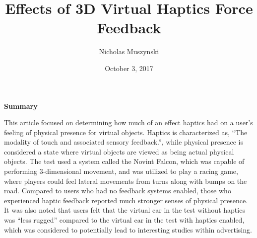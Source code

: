 \documentclass{article}
\begin{document}
\title{Effects of 3D Virtual Haptics Force Feedback}
\author{Nicholas Muszynski}
\date{October 3, 2017}

\maketitle

\textbf{Summary}
\newline

This article focused on determining how much of an effect haptics had on a user's feeling of physical presence for virtual objects. Haptics is characterized as, "`The modality of touch and associated sensory feedback."', while physical presence is considered a state where virtual objects are viewed as being actual physical objects. The test used a system called the Novint Falcon, which was capable of performing 3-dimensional movement, and was utilized to play a racing game, where players could feel lateral movements from turns along with bumps on the road. Compared to users who had no feedback systems enabled, those who experienced haptic feedback reported much stronger senses of physical presence. It was also noted that users felt that the virtual car in the test without haptics was "`less rugged"' compared to the virtual car in the test with haptics enabled, which was considered to potentially lead to interesting studies within advertising.

\nocite{article1cite}



\end{document}
